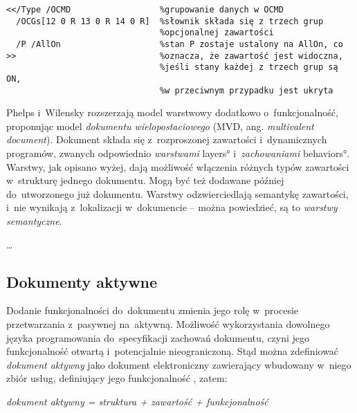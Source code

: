 \begin{verbatim}
<</Type /OCMD                  %grupowanie danych w OCMD
  /OCGs[12 0 R 13 0 R 14 0 R]  %słownik składa się z trzech grup
                               %opcjonalnej zawartości
  /P /AllOn                    %stan P zostaje ustalony na AllOn, co
>>                             %oznacza, że zawartość jest widoczna, 
                               %jeśli stany każdej z trzech grup są ON,
                               %w przeciwnym przypadku jest ukryta           
\end{verbatim}

Phelps i~Wilensky \cite{Phelps96, Phelps98_tech_rep} rozszerzają model warstwowy dodatkowo o~funkcjonalność, proponując model \emph{dokumentu wielopostaciowego} (MVD, ang.\emph{ multivalent document}). Dokument składa się z~rozproszonej zawartości i~dynamicznych programów, zwanych odpowiednio \emph{warstwami} \ang{layers} i~\emph{zachowaniami} \ang{behaviors}. Warstwy, jak opisano wyżej, dają możliwość włączenia różnych typów zawartości w~strukturę jednego dokumentu. Mogą być też dodawane później do~utworzonego już dokumentu. Warstwy odzwierciedlają semantykę zawartości, i~nie wynikają z~lokalizacji w~dokumencie -- można powiedzieć, są to \emph{warstwy semantyczne}. 

\dots


\subsection{Dokumenty aktywne}
\label{sec:DokumentyAktywne}

Dodanie funkcjonalności do~dokumentu zmienia jego rolę w~procesie przetwarzania z~pasywnej na~aktywną. Możliwość wykorzystania dowolnego języka programowania do~specyfikacji zachowań dokumentu, czyni jego funkcjonalność otwartą i~potencjalnie nieograniczoną. Stąd można zdefiniować \emph{dokument aktywny} jako dokument elektroniczny zawierający wbudowany w~niego zbiór usług, definiujący jego funkcjonalność \cite{Ciancarini2002}, zatem: 

\begin{center}
\emph{dokument aktywny = struktura + zawartość + funkcjonalność}

\end{center}

